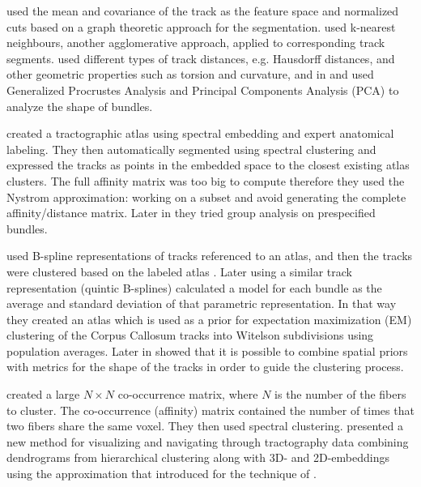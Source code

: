 \documentclass{bioinfo}
\begin{document}
\citet{brun2004clustering} used the mean and covariance
of the track as the feature space and normalized cuts based on a graph
theoretic approach for the segmentation. \citet{Ding2003a}
used k-nearest neighbours, another agglomerative approach, applied
to corresponding track segments. \citet{corouge2004towards}
used different types of track distances, e.g. Hausdorff distances,
and other geometric properties such as torsion and curvature, and
in \citet{Corouge2004} and \citet{Corouge2006} used Generalized Procrustes
Analysis and Principal Components Analysis (PCA) to analyze the shape
of bundles.

\citet{ODonnell_IEEETMI07} created a tractographic
atlas using spectral embedding and expert anatomical labeling. They
then automatically segmented using spectral clustering and expressed
the tracks as points in the embedded space to the closest existing
atlas clusters. The full affinity matrix was too big to compute therefore
they used the Nystrom approximation: working on a subset and avoid
generating the complete affinity/distance matrix. Later in \citet{o2009tract}
they tried group analysis on prespecified bundles.

\citet{Maddah_MICCA2005} used B-spline representations of tracks
referenced to an atlas, and then the tracks were clustered based on the
labeled atlas . Later \citet{maddah2006statistical} using a similar
track representation (quintic B-splines) calculated a model for each
bundle as the average and standard deviation of that parametric
representation. In that way they created an atlas which is used as a
prior for expectation maximization (EM) clustering of the Corpus
Callosum tracks into Witelson subdivisions \citep{witelson1989hand}
using population averages. Later in \citet{Maddah_IEEEBI2008} showed
that it is possible to combine spatial priors with metrics for the shape
of the tracks in order to guide the clustering process.

\citet{jonasson2005fiber} created a large $N\times N$
co-occurrence matrix, where $N$ is the number of the fibers to cluster.
The co-occurrence (affinity) matrix contained the number of times
that two fibers share the same voxel. They then used spectral clustering.
\citet{jianu2009exploring} presented a new method for
visualizing and navigating through tractography data combining dendrograms
from hierarchical clustering along with 3D- and 2D-embeddings using
the approximation that \citet{chalmers1996linear} introduced
for the technique of \citet{eades1984heuristic}.
\end{document}
